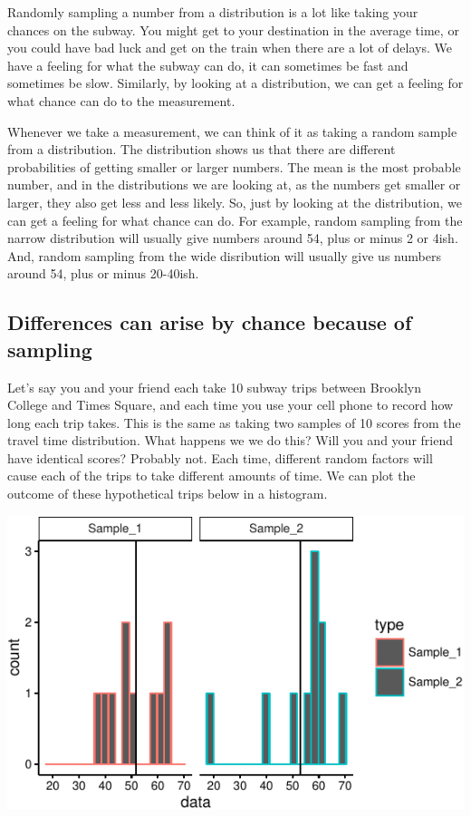 Randomly sampling a number from a distribution is a lot like taking your
chances on the subway. You might get to your destination in the average
time, or you could have bad luck and get on the train when there are a
lot of delays. We have a feeling for what the subway can do, it can
sometimes be fast and sometimes be slow. Similarly, by looking at a
distribution, we can get a feeling for what chance can do to the
measurement.

Whenever we take a measurement, we can think of it as taking a random
sample from a distribution. The distribution shows us that there are
different probabilities of getting smaller or larger numbers. The mean
is the most probable number, and in the distributions we are looking at,
as the numbers get smaller or larger, they also get less and less
likely. So, just by looking at the distribution, we can get a feeling
for what chance can do. For example, random sampling from the narrow
distribution will usually give numbers around 54, plus or minus 2 or
4ish. And, random sampling from the wide disribution will usually give
us numbers around 54, plus or minus 20-40ish.

\subsection{Differences can arise by chance because of
sampling}\label{differences-can-arise-by-chance-because-of-sampling}

Let's say you and your friend each take 10 subway trips between Brooklyn
College and Times Square, and each time you use your cell phone to
record how long each trip takes. This is the same as taking two samples
of 10 scores from the travel time distribution. What happens we we do
this? Will you and your friend have identical scores? Probably not. Each
time, different random factors will cause each of the trips to take
different amounts of time. We can plot the outcome of these hypothetical
trips below in a histogram.

\includegraphics{Ttest_files/figure-latex/unnamed-chunk-2-1}

